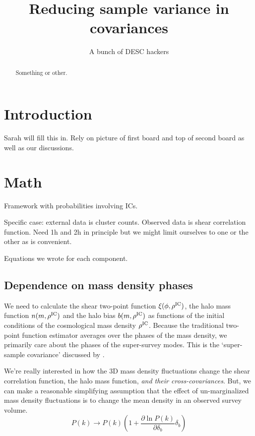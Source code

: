 \documentclass[preprint]{aastex}
\newcommand{\skyangle}{\phi}
\newcommand{\rhoic}{\rho^{\rm IC}}
\begin{document}
\title{Reducing sample variance in covariances}

\author{A bunch of DESC hackers}
\begin{abstract}
Something or other.
\end{abstract}

\section{Introduction}

Sarah will fill this in.  Rely on picture of first board and top of second board as well as our discussions.

\section{Math}

Framework with probabilities involving ICs.

Specific case: external data is cluster counts.  Observed data is shear correlation function.  Need
1h and 2h in principle but we might limit ourselves to one or the other as is convenient.

Equations we wrote for each component.


\subsection{Dependence on mass density phases} %
\label{sub:dependence_on_mass_density_phases}
We need to calculate the shear two-point function $\xi(\skyangle, \rhoic)$, 
the halo mass function $n(m, \rhoic)$
and the halo bias $b(m, \rhoic)$ as functions of the initial conditions of the 
cosmological mass density $\rhoic$. 
Because the traditional two-point function estimator averages over the phases 
of the mass density, we primarily care about the phases of the super-survey 
modes. This is the `super-sample covariance' discussed by 
\citet{takada2013}.

We're really interested in how the 3D mass density fluctuations change the
shear correlation function, the halo mass function, \emph{and their 
cross-covariances}. But, we can make a reasonable simplifying assumption that 
the effect of un-marginalized mass density fluctuations is to change the mean density 
in an observed survey volume. 
\begin{equation}
	P(k) \rightarrow P(k) \left(
	1 + \frac{\partial \ln P(k)}{\partial \delta_b} \delta_b\right)
\end{equation}
\end{document}
